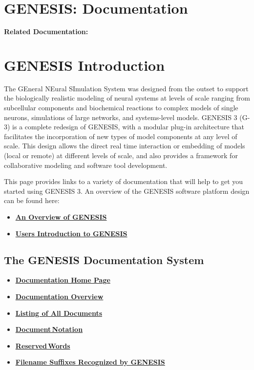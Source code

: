 \documentclass[12pt]{article}
\begin{document}
\section*{GENESIS: Documentation}

{\bf Related Documentation:}

\section*{GENESIS Introduction}

The GEneral NEural SImulation System was designed from the outset
to support the biologically realistic modeling of neural systems at levels
of scale ranging from subcellular components and biochemical reactions to
complex models of single neurons, simulations of large networks, and
systems-level models.  GENESIS 3 (G-3) is a complete redesign of GENESIS,
with a modular plug-in architecture that facilitates the incorporation of
new types of model components at any level of scale.  This design allows
the direct real time interaction or embedding of models (local or remote)
at different levels of scale, and also provides a framework for
collaborative modeling and software tool development.

This page provides links to a variety of documentation that will help to get you started
using GENESIS 3. An overview of the GENESIS software platform design can be found here:

\begin{itemize}
\item \href{../genesis-overview/genesis-overview.tex}{\bf An Overview of GENESIS}
\item \href{../user-intro/user-intro.tex}{\bf Users Introduction to GENESIS}
\end{itemize}


\subsection*{The GENESIS Documentation System}
\begin{itemize}
\item \href{../documentation-homepage/documentation-homepage.tex}{\bf Documentation Home Page}
\item \href{../documentation-overview/documentation-overview.tex}{\bf Documentation Overview}
\item \href{../index.html}{\bf Listing of All Documents}
\item \href{../document-notation/document-notation.tex}{\bf Document\,Notation}
\item \href{../reserved-words/reserved-words.tex}{\bf Reserved\,Words}
\item \href{../common-suffixes/common-suffixes.tex}{\bf Filename Suffixes Recognized by GENESIS} 
\end{itemize}
\end{document}
